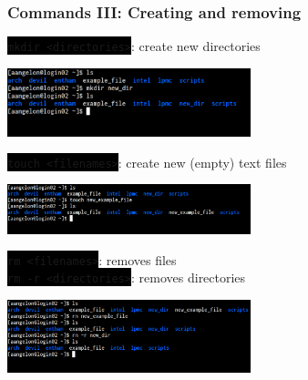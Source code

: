 \documentclass[unknownkeysallowed, 10pt, a4 paper, handout]{beamer}
\newcommand{\code}[1]{\colorbox{black}{\color{green}\texttt{#1}}}
\begin{document}
\begin{frame}[c]
  \begin{center}
    \frametitle{Commands III: Creating and removing}
    \code{mkdir <directories>}: create new directories
    \vspace{-4mm}

    \begin{center}
      \includegraphics[width=0.53\textwidth]{pics/mkdir.png}
    \end{center}

    \code{touch <filenames>}: create new (empty) text files
    \vspace{-4mm}

    \begin{center}
      \includegraphics[width=0.53\textwidth]{pics/touch.png}
    \end{center}

    \code{rm <filenames>}: removes files\\
    \code{rm -r <directories>}: removes directories
    \vspace{-4.5mm}

    \begin{center}
      \includegraphics[width=0.53\textwidth]{pics/rm.png}
    \end{center}
    \vspace{-2mm}
  \end{center}
\end{frame}
\end{document}
